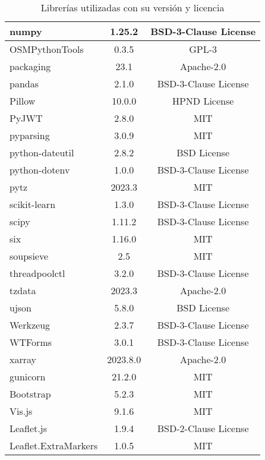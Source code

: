 \begin{table}[h!]
\begin{tabular}{|l|c|c|}
\hline
numpy & 1.25.2 & BSD-3-Clause License\\
\hline
OSMPythonTools & 0.3.5 &  GPL-3\\
\hline
packaging & 23.1 &  Apache-2.0\\
\hline
pandas & 2.1.0 & BSD-3-Clause License\\
\hline
Pillow & 10.0.0 & HPND License\\
\hline
PyJWT & 2.8.0 & MIT \\
\hline
pyparsing & 3.0.9 & MIT\\
\hline
python-dateutil & 2.8.2 & BSD License\\
\hline
python-dotenv & 1.0.0 &  BSD-3-Clause License\\
\hline
pytz & 2023.3 & MIT \\
\hline
scikit-learn & 1.3.0 & BSD-3-Clause License\\
\hline
scipy & 1.11.2 & BSD-3-Clause License\\
\hline
six & 1.16.0 & MIT \\
\hline
soupsieve & 2.5 & MIT\\
\hline
threadpoolctl & 3.2.0 & BSD-3-Clause License\\
\hline
tzdata & 2023.3 &  Apache-2.0\\
\hline
ujson & 5.8.0 & BSD License\\
\hline
Werkzeug & 2.3.7  &BSD-3-Clause License \\
\hline
WTForms & 3.0.1 & BSD-3-Clause License\\
\hline
xarray & 2023.8.0 & Apache-2.0 \\
\hline
gunicorn & 21.2.0 & MIT \\
\hline
Bootstrap & 5.2.3 & MIT \\
\hline
Vis.js & 9.1.6 & MIT \\
\hline
Leaflet.js & 1.9.4 & BSD-2-Clause License \\
\hline
Leaflet.ExtraMarkers & 1.0.5 & MIT \\
\hline
\end{tabular}
\caption{Librerías utilizadas con su versión y licencia}
\label{tab:librerias-licencias}
\end{table}


